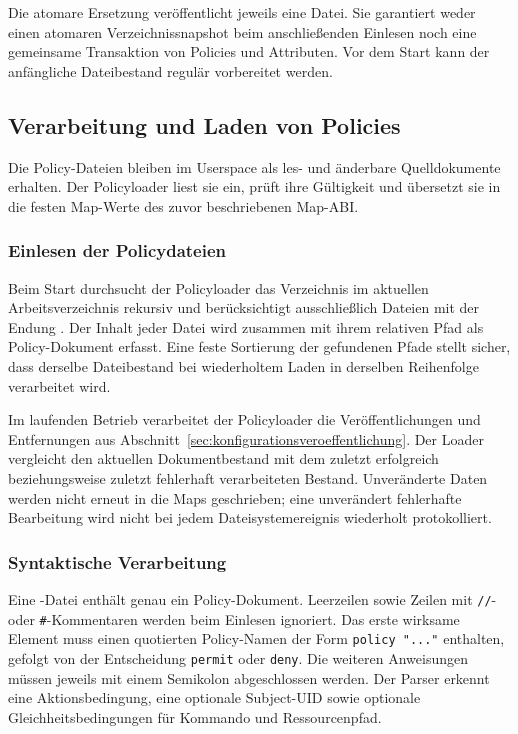 Die atomare Ersetzung veröffentlicht jeweils eine Datei. Sie garantiert weder einen atomaren Verzeichnissnapshot beim anschließenden Einlesen noch eine gemeinsame Transaktion von Policies und Attributen. Vor dem Start kann der anfängliche Dateibestand regulär vorbereitet werden.

\subsection{Verarbeitung und Laden von Policies}\label{sec:policy-loading}
Die Policy-Dateien bleiben im Userspace als les- und änderbare Quelldokumente erhalten. Der Policyloader liest sie ein, prüft ihre Gültigkeit und übersetzt sie in die festen Map-Werte des zuvor beschriebenen Map-ABI.

\subsubsection{Einlesen der Policydateien}
Beim Start durchsucht der Policyloader das Verzeichnis  im aktuellen Arbeitsverzeichnis rekursiv und berücksichtigt ausschließlich Dateien mit der Endung . Der Inhalt jeder Datei wird zusammen mit ihrem relativen Pfad als Policy-Dokument erfasst. Eine feste Sortierung der gefundenen Pfade stellt sicher, dass derselbe Dateibestand bei wiederholtem Laden in derselben Reihenfolge verarbeitet wird.

Im laufenden Betrieb verarbeitet der Policyloader die Veröffentlichungen und Entfernungen aus Abschnitt~\ref{sec:konfigurationsveroeffentlichung}.
Der Loader vergleicht den aktuellen Dokumentbestand mit dem zuletzt erfolgreich beziehungsweise zuletzt fehlerhaft verarbeiteten Bestand. Unveränderte Daten werden nicht erneut in die Maps geschrieben; eine unverändert fehlerhafte Bearbeitung wird nicht bei jedem Dateisystemereignis wiederholt protokolliert.

\subsubsection{Syntaktische Verarbeitung}
Eine -Datei enthält genau ein Policy-Dokument. Leerzeilen sowie Zeilen mit \texttt{//}- oder \texttt{\#}-Kommentaren werden beim Einlesen ignoriert. Das erste wirksame Element muss einen quotierten Policy-Namen der Form \texttt{policy "..."} enthalten, gefolgt von der Entscheidung \texttt{permit} oder \texttt{deny}. Die weiteren Anweisungen müssen jeweils mit einem Semikolon abgeschlossen werden. Der Parser erkennt eine Aktionsbedingung, eine optionale Subject-UID sowie optionale Gleichheitsbedingungen für Kommando und Ressourcenpfad.

